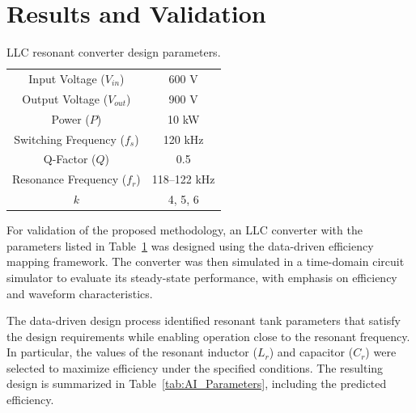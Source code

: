 \section{Results and Validation} \label{sec:results}

\begin{table}[!htb]
    \caption{LLC resonant converter design parameters.}
    \label{tab:LLC_Parameters}
    \centering
    \renewcommand{\arraystretch}{1.3} %
    
    \begin{tabular}{cc}
        \hline
        Input Voltage ($V_{in}$)        & 600 V          \\ 
        Output Voltage ($V_{out}$)      & 900 V          \\ 
        Power ($P$)                    & 10 kW          \\
        Switching Frequency ($f_s$)     & 120 kHz        \\ 
        Q-Factor ($Q$)                & 0.5            \\ 
        Resonance Frequency ($f_r$)    & 118--122 kHz   \\ 
        $k$                           & 4, 5, 6        \\ 
        \hline
    \end{tabular}
\end{table}

For validation of the proposed methodology, an LLC converter with the parameters listed in Table~\ref{tab:LLC_Parameters} was designed using the data-driven efficiency mapping framework. The converter was then simulated in a time-domain circuit simulator to evaluate its steady-state performance, with emphasis on efficiency and waveform characteristics.

The data-driven design process identified resonant tank parameters that satisfy the design requirements while enabling operation close to the resonant frequency. In particular, the values of the resonant inductor ($L_r$) and capacitor ($C_r$) were selected to maximize efficiency under the specified conditions. The resulting design is summarized in Table~\ref{tab:AI_Parameters}, including the predicted efficiency.

